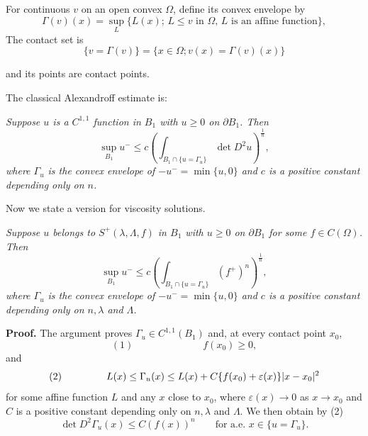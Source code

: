 For continuous $v$ on an open convex $\Omega$, define its convex envelope by
\[
\Gamma(v)(x)=\sup_L\{L(x);\, L\le v \text{ in }\Omega,\, L \text{ is an affine function}\},
\]
The contact set is
\[
\{v=\Gamma(v)\}=\{x\in\Omega; v(x)=\Gamma(v)(x)\}
\]



and its points are contact points.

\medskip


The classical Alexandroff estimate is:

\medskip

\begin{lemma}\label{hanlin:ch05-lem-5-7} \emph{Suppose $u$ is a $C^{1,1}$ function in $B_1$ with $u \ge 0$ on $\partial B_1$. Then}
\[
\sup_{B_1} u^- \le c\left(\int_{B_1\cap\{u=\Gamma_u\}} \det D^2u\right)^{\frac{1}{n}},
\]
\emph{where $\Gamma_u$ is the convex envelope of $-u^- = \min\{u,0\}$ and $c$ is a positive constant depending only on $n$.}
\end{lemma}

\medskip


\noindent Now we state a version for viscosity solutions.

\medskip

\begin{theorem}\label{hanlin:ch05-thm-5-8} \emph{Suppose $u$ belongs to $S^+(\lambda,\Lambda,f)$ in $B_1$ with $u \ge 0$ on $\partial B_1$ for some $f\in C(\Omega)$. Then}
\[
\sup_{B_1} u^- \le c\left(\int_{B_1\cap\{u=\Gamma_u\}} (f^+)^n\right)^{\frac{1}{n}},
\]
\emph{where $\Gamma_u$ is the convex envelope of $-u^- = \min\{u,0\}$ and $c$ is a positive constant depending only on $n,\lambda$ and $\Lambda$.}
\end{theorem}

\medskip

\textbf{Proof.} \sketch The argument proves $\Gamma_u\in C^{1,1}(B_1)$ and, at every contact point $x_0$,
\[
(1)\hspace{7em} f(x_0)\ge 0,
\]
and
\[
(2)\hspace{4.5em} L(x)\le \Gamma_u(x)\le L(x)+C\{f(x_0)+\varepsilon(x)\}|x-x_0|^2
\]
for some affine function $L$ and any $x$ close to $x_0$, where $\varepsilon(x)\to 0$ as $x\to x_0$ and $C$
is a positive constant depending only on $n,\lambda$ and $\Lambda$. We then obtain by (2)
\[
\det D^2\Gamma_u(x)\le C(f(x))^n \qquad \text{for a.e. } x\in\{u=\Gamma_u\}.
\]

